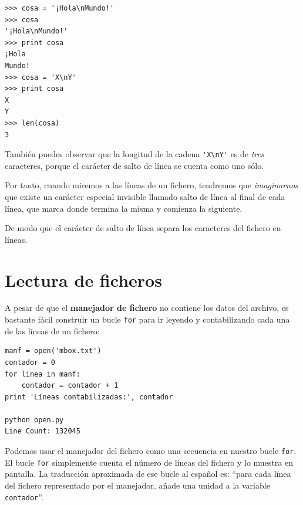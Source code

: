 \beforeverb
\begin{verbatim}
>>> cosa = '¡Hola\nMundo!'
>>> cosa
'¡Hola\nMundo!'
>>> print cosa
¡Hola
Mundo!
>>> cosa = 'X\nY'
>>> print cosa
X
Y
>>> len(cosa)
3
\end{verbatim}
\afterverb
%

También puedes observar que la longitud de la cadena \verb"'X\nY'" es de \emph{tres}
caracteres, porque el carácter de salto de línea se cuenta como uno sólo.

Por tanto, cuando miremos a las líneas de un fichero, tendremos que \emph{imaginarnos}
que existe un carácter especial invisible llamado salto de línea al
final de cada línea, que marca donde termina la misma y comienza la siguiente.


De modo que el carácter de salto de línea separa los caracteres
del fichero en líneas.

\section{Lectura de ficheros}

A pesar de que el {\bf manejador de fichero} no contiene los datos del archivo,
es bastante fácil construir un bucle {\tt for} para ir leyendo
y contabilizando cada una de las líneas de un fichero:

\beforeverb
\begin{verbatim}
manf = open('mbox.txt')
contador = 0
for linea in manf:
    contador = contador + 1
print 'Líneas contabilizadas:', contador

python open.py 
Line Count: 132045
\end{verbatim}
\afterverb
%
Podemos usar el manejador del fichero como una secuencia en nuestro bucle {\tt for}.
El bucle {\tt for} simplemente cuenta el número de líneas del
fichero y lo muestra en pantalla. La traducción aproximada de ese bucle
al español es: ``para cada línea del fichero representado por el
manejador, añade una unidad a la variable {\tt contador}''.

